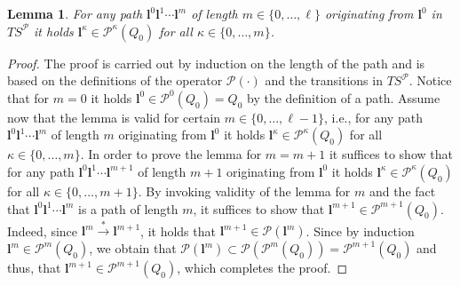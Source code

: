 \documentclass[reqno]{amsart}
\theoremstyle{plain}
\newtheorem{lemma}[thm]{Lemma}
\theoremstyle{definition}
\numberwithin{equation}{section}
\begin{document}
\begin{lemma} \label{lemma:path:in:Pk}
For any path ${\textbf{{l}}}^0 {\textbf{{l}}}^1\cdots{\textbf{{l}}}^{m}$ of length $m\in\{0,\ldots,\ell\}$ originating from ${\textbf{{l}}}^0$ in $TS^{\ensuremath{\mathcal{P}}}$ it holds ${\textbf{{l}}}^{\kappa}\in{\ensuremath{\mathcal{P}}}^{\kappa}(Q_0)$ for all $\kappa\in\{0,\ldots,m\}$. 
\end{lemma}

\begin{proof}
The proof is carried out by induction on the length of the path and is based on the definitions of the operator ${\ensuremath{\mathcal{P}}}(\cdot)$ and the transitions in $TS^{\ensuremath{\mathcal{P}}}$. Notice that for $m=0$ it holds ${\textbf{{l}}}^0\in{\ensuremath{\mathcal{P}}}^0(Q_0)=Q_0$ by the definition of a path. Assume now that the lemma is valid for certain $m\in\{0,\ldots,\ell-1\}$, i.e., for any path ${\textbf{{l}}}^0 {\textbf{{l}}}^1\cdots{\textbf{{l}}}^{m}$ of length $m$ originating from ${\textbf{{l}}}^0$ it holds ${\textbf{{l}}}^{\kappa}\in{\ensuremath{\mathcal{P}}}^{\kappa}(Q_0)$ for all $\kappa\in\{0,\ldots,m\}$. In order to prove the lemma for $m=m+1$ it suffices to show that for any path ${\textbf{{l}}}^0 {\textbf{{l}}}^1\cdots{\textbf{{l}}}^{m+1}$ of length $m+1$ originating from ${\textbf{{l}}}^0$ it holds ${\textbf{{l}}}^{\kappa}\in{\ensuremath{\mathcal{P}}}^{\kappa}(Q_0)$ for all $\kappa\in\{0,\ldots,m+1\}$. By invoking validity of the lemma for $m$ and the fact that ${\textbf{{l}}}^0 {\textbf{{l}}}^1\cdots{\textbf{{l}}}^{m}$ is a path of length $m$, it suffices to show that ${\textbf{{l}}}^{m+1}\in{\ensuremath{\mathcal{P}}}^{m+1}(Q_0)$. Indeed, since ${\textbf{{l}}}^m \overset{*}{\longrightarrow}{\textbf{{l}}}^{m+1}$, it holds that ${\textbf{{l}}}^{m+1}\in  {\ensuremath{\mathcal{P}}}({\textbf{{l}}}^m)$. Since by induction ${\textbf{{l}}}^m\in{\ensuremath{\mathcal{P}}}^m(Q_0)$, we obtain that ${\ensuremath{\mathcal{P}}}({\textbf{{l}}}^m)\subset{\ensuremath{\mathcal{P}}}({\ensuremath{\mathcal{P}}}^
m(Q_0))={\ensuremath{\mathcal{P}}}^{m+1}(Q_0)$ and thus, that ${\textbf{{l}}}^{m+1}\in {\ensuremath{\mathcal{P}}}^{m+1}(Q_0)$, which completes the proof.
\end{proof}
\end{document}
